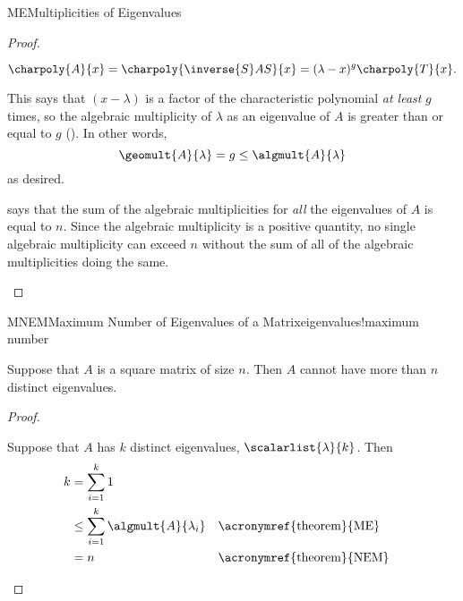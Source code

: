 \begin{subsect}{ME}{Multiplicities of Eigenvalues}
\begin{proof}
\begin{para}
%
\begin{equation*}
\charpoly{A}{x}=\charpoly{\inverse{S}AS}{x}=(\lambda-x)^g\charpoly{T}{x}.
\end{equation*}
\end{para}
%
\begin{para}This says that $(x-\lambda)$ is a factor of the characteristic polynomial {\em at least} $g$ times, so the algebraic multiplicity of $\lambda$ as an eigenvalue of $A$ is greater than or equal to $g$ ().  In other words,
%
\begin{equation*}
\geomult{A}{\lambda}=g\leq\algmult{A}{\lambda}
\end{equation*}
%
as desired.\end{para}
%
\begin{para} says that the sum of the algebraic multiplicities for {\em all} the eigenvalues of $A$ is equal to $n$.  Since the algebraic multiplicity is a positive quantity, no single algebraic multiplicity can exceed $n$ without the sum of all of the algebraic multiplicities doing the same.\end{para}
%
\end{proof}
%
%
\begin{theorem}{MNEM}{Maximum Number of Eigenvalues of a Matrix}{eigenvalues!maximum number}
\begin{para}Suppose that $A$ is a square matrix of size $n$.  Then $A$ cannot have more than $n$ distinct eigenvalues.\end{para}
\end{theorem}
%
\begin{proof}
\begin{para}Suppose that $A$ has $k$ distinct eigenvalues, $\scalarlist{\lambda}{k}$.  Then
%
\begin{align*}
k&=\sum_{i=1}^{k}1\\
&\leq\sum_{i=1}^{k}\algmult{A}{\lambda_i}&&\text{\acronymref{theorem}{ME}}\\
&=n&&\text{\acronymref{theorem}{NEM}}
\end{align*}
\end{para}
%
\end{proof}
%
\end{subsect}
%
